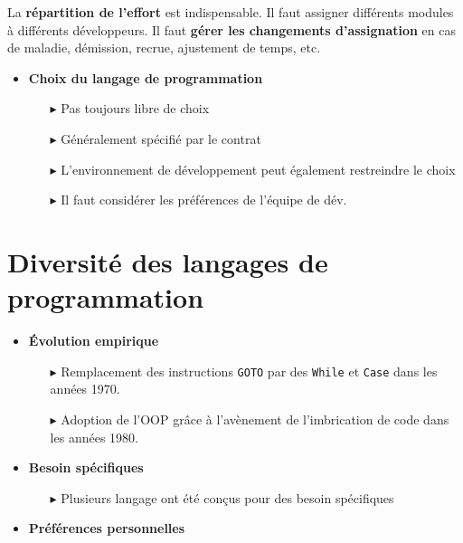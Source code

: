 \documentclass[16pt]{report}
\begin{document}
\begin{multicols*}{2}
    \begin{note}{}{}
        La \textbf{répartition de l'effort} est indispensable. Il faut \textcolor{myb}{assigner} différents 
        modules à différents développeurs. Il faut \textbf{gérer les changements d'assignation} 
        en cas de maladie, démission, recrue, ajustement de temps, etc. 
    \end{note}

    \begin{itemize}
        \item \textbf{Choix du langage de programmation}  
        \begin{itemize}
            \item[$\blacktriangleright$] Pas toujours libre de choix 
            \item[$\blacktriangleright$] Généralement spécifié par le contrat
            \item[$\blacktriangleright$] L'environnement de développement peut également restreindre le choix 
            \item[$\blacktriangleright$] Il faut considérer les préférences de l'équipe de dév. 
        \end{itemize}
    \end{itemize}

    \section{Diversité des langages de programmation}


    \begin{itemize}
        \item \textbf{Évolution empirique}  
            \begin{itemize}
                \item[$\blacktriangleright$] Remplacement des instructions \texttt{GOTO} par des 
                    \texttt{While} et \texttt{Case} dans les années 1970.     
                \item[$\blacktriangleright$] Adoption de l'OOP grâce à l'avènement de l'imbrication de code 
                    dans les années 1980.
            \end{itemize}
        \item \textbf{Besoin spécifiques}  
            \begin{itemize}
                \item[$\blacktriangleright$] Plusieurs langage ont été conçus pour des besoin spécifiques 
            \end{itemize}
        \item \textbf{Préférences personnelles}  
    \end{itemize}


\end{multicols*}
\end{document}
